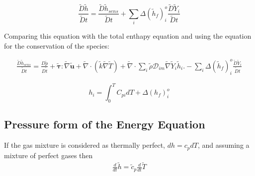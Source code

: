 \documentclass[preprint,12pt,authoryear]{elsarticle}
\begin{document}
\begin{equation}
	\frac{\tilde{D} \tilde{h}}{\tilde{D} t}
	=
	\frac{\tilde{D}\tilde{h}_{sens}}{\tilde{D}t}
	+
	\sum_i\Delta(\tilde{h}_f)_i^o
	\frac{\tilde{D}\tilde{Y}_i}{\tilde{D}t}
\end{equation}

Comparing this equation with the total enthapy equation and 
using the equation for the conservation of the species:

\begin{equation}
\begin{split}
	    \frac{\tilde{D}\tilde{h}_{sens}}{\tilde{D}t}
=
        \frac{D \tilde{p}}{D\tilde{t}}
+       
        \pmb{\tilde{\tau}}:\tilde{\nabla} \tilde{\mathbf{u}} 
+ 
        \tilde{\nabla} \cdot (\tilde{k}\tilde{\nabla} \tilde{T})
+
        \tilde{\nabla} \cdot
        \sum\limits_i 
        \tilde{\rho}\mathcal{D}_{im}\tilde{\nabla}\tilde{Y}_i     
        \tilde{h}_i.
-
    	\sum_i\Delta(\tilde{h}_f)_i^o
        \frac{\tilde{D}\tilde{Y}_i}{\tilde{D}t}
\end{split}
\end{equation}



\begin{equation}
	h_i=\int_0^TC_{pi}dT+\Delta(h_f)_i^o
\end{equation}



\subsection{Pressure form  of the Energy Equation}

%
If the gas mixture is considered as thermally perfect, 
$dh=c_{p}dT$, and assuming a mixture of perfect gases then 
\begin{equation}
\begin{split}
        \frac{d}{dt}\tilde{h}=\tilde{c}_p\frac{d}{dt}\tilde{T}
\end{split}
\end{equation}
\end{document}
